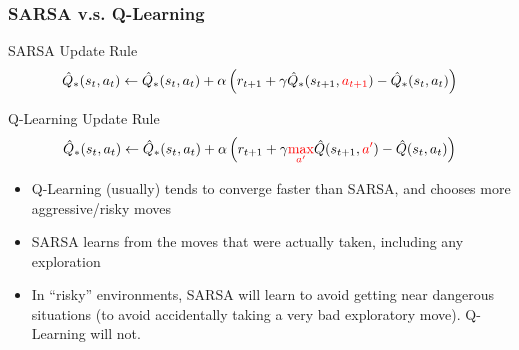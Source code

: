 \documentclass[10pt,a4paper]{beamer}
\newcommand{\red}[1]{\textcolor{red}{#1}}
\begin{document}
\begin{frame}
	\frametitle{SARSA v.s. Q-Learning}
	\begin{block}{SARSA Update Rule}
		$$
		\hat{Q}_*(s_t, a_t) \leftarrow  \hat{Q}_*(s_t, a_t) + \alpha 
		\left( r_{t+1} + \gamma \hat{Q}_*(s_{t+1}, \red{a_{t+1}}) - \hat{Q}_*(s_t, a_t) \right) 
		$$
	\end{block}
\begin{block}{Q-Learning Update Rule}
	$$
	\hat{Q}_*(s_t, a_t)  \leftarrow \hat{Q}_*(s_t,a_t)
	+ \alpha \left( 
	r_{t+1} + \gamma \red{\max_{a'}} \hat{Q}(s_{t+1}, \red{a'}) - \hat{Q}(s_t, a_t)
	\right)
	$$
\end{block}
\begin{itemize}
	\item Q-Learning (usually) tends to converge faster than SARSA, and chooses more
	aggressive/risky moves 
	\item SARSA learns from the moves that were actually
	taken, including any exploration
	\item In ``risky'' environments, SARSA will learn to avoid getting near dangerous situations
	(to avoid accidentally taking a very bad exploratory move). Q-Learning will not.
\end{itemize}
\end{frame}


	


	
\end{document}
